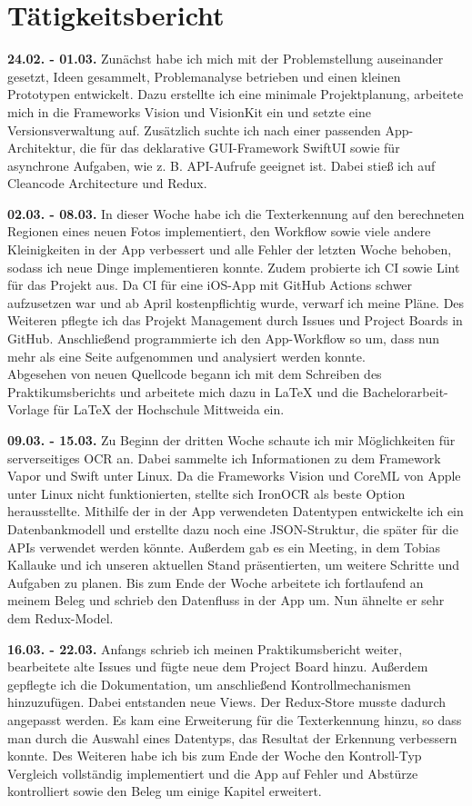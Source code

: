 \documentclass[notables, nomenclature, oneside, 150]{HSMW-Thesis}
\begin{document}
\chapter{Tätigkeitsbericht}
	\textbf{24.02. - 01.03.}
	Zunächst habe ich mich mit der Problemstellung auseinander gesetzt, Ideen gesammelt, Problemanalyse betrieben und einen kleinen Prototypen entwickelt. Dazu erstellte ich eine minimale Projektplanung, arbeitete mich in die Frameworks Vision und VisionKit ein und setzte eine Versionsverwaltung auf. Zusätzlich suchte ich nach einer passenden App-Architektur, die für das deklarative GUI-Framework SwiftUI sowie für asynchrone Aufgaben, wie z. B. API-Aufrufe geeignet ist. Dabei stieß ich auf Cleancode Architecture und Redux.
	
	\textbf{02.03. - 08.03.} 
	In dieser Woche habe ich die Texterkennung auf den berechneten Regionen eines neuen Fotos implementiert, den Workflow sowie viele andere Kleinigkeiten in der App verbessert und alle Fehler der letzten Woche behoben, sodass ich neue Dinge implementieren konnte. Zudem probierte ich CI sowie Lint für das Projekt aus. Da CI für eine iOS-App mit GitHub Actions schwer aufzusetzen war und ab April kostenpflichtig wurde, verwarf ich meine Pläne. Des Weiteren pflegte ich das Projekt Management durch Issues und Project Boards in GitHub. Anschließend programmierte ich den App-Workflow so um, dass nun mehr als eine Seite aufgenommen und analysiert werden konnte. \\ 			
	Abgesehen von neuen Quellcode begann ich mit dem Schreiben des Praktikumsberichts und arbeitete mich dazu in \LaTeX \xspace und die Bachelorarbeit-Vorlage für \LaTeX \xspace der Hochschule Mittweida ein.
	
	\textbf{09.03. - 15.03.} 
	Zu Beginn der dritten Woche schaute ich mir Möglichkeiten für serverseitiges OCR an. Dabei sammelte ich Informationen zu dem Framework Vapor und Swift unter Linux. Da die Frameworks Vision und CoreML von Apple unter Linux nicht funktionierten, stellte sich IronOCR als beste Option herausstellte. Mithilfe der in der App verwendeten Datentypen entwickelte ich ein Datenbankmodell und erstellte dazu noch eine JSON-Struktur, die später für die APIs verwendet werden könnte. Außerdem gab es ein Meeting, in dem Tobias Kallauke und ich unseren aktuellen Stand präsentierten, um weitere Schritte und Aufgaben zu planen. Bis zum Ende der Woche arbeitete ich fortlaufend an meinem Beleg und schrieb den Datenfluss in der App um. Nun ähnelte er sehr dem Redux-Model.
	
	\textbf{16.03. - 22.03.} 
	Anfangs schrieb ich meinen Praktikumsbericht weiter, bearbeitete alte Issues und fügte neue dem Project Board hinzu. Außerdem gepflegte ich die Dokumentation, um anschließend Kontrollmechanismen hinzuzufügen. Dabei entstanden neue Views. Der Redux-Store musste dadurch angepasst werden. Es kam eine Erweiterung für die Texterkennung hinzu, so dass man durch die Auswahl eines Datentyps, das Resultat der Erkennung verbessern konnte. Des Weiteren habe ich bis zum Ende der Woche den Kontroll-Typ Vergleich vollständig implementiert und die App auf Fehler und Abstürze kontrolliert sowie den Beleg um einige Kapitel erweitert.
	
\end{document}
